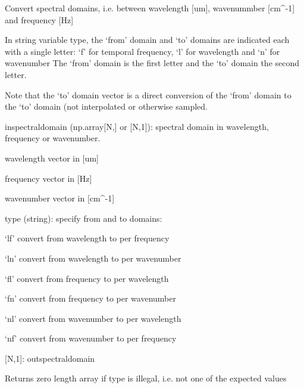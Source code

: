 \documentclass[a4paper,10pt,english]{sphinxmanual}
\begin{document}
\begin{fulllineitems}
\label{ryutils:pyradi.ryutils.convertSpectralDomain}
Convert spectral domains, i.e. between wavelength {[}um{]}, wavenummber {[}cm\textasciicircum{}-1{]} and frequency {[}Hz{]}

In string variable type, the `from' domain and `to' domains are indicated each with a single letter:
`f' for temporal frequency, `l' for wavelength and `n' for wavenumber
The `from' domain is the first letter and the `to' domain the second letter.

Note that the `to' domain vector is a direct conversion of the `from' domain
to the `to' domain (not interpolated or otherwise sampled.
\begin{description}
\item[{Args:}] \leavevmode
\begin{DUlineblock}{0em}
\item[] inspectraldomain (np.array{[}N,{]} or {[}N,1{]}):  spectral domain in wavelength, frequency or wavenumber.
\item[]
\begin{DUlineblock}{\DUlineblockindent}
\item[] wavelength vector in  {[}um{]}
\item[] frequency vector in  {[}Hz{]}
\item[] wavenumber vector in   {[}cm\textasciicircum{}-1{]}
\end{DUlineblock}
\item[] type (string):  specify from and to domains:
\item[]
\begin{DUlineblock}{\DUlineblockindent}
\item[] `lf' convert from wavelength to per frequency
\item[] `ln' convert from wavelength to per wavenumber
\item[] `fl' convert from frequency to per wavelength
\item[] `fn' convert from frequency to per wavenumber
\item[] `nl' convert from wavenumber to per wavelength
\item[] `nf' convert from wavenumber to per frequency
\end{DUlineblock}
\end{DUlineblock}

\item[{Returns:}] \leavevmode
\begin{DUlineblock}{0em}
\item[] {[}N,1{]}: outspectraldomain
\item[] Returns zero length array if type is illegal, i.e. not one of the expected values
\end{DUlineblock}


\end{description}
\end{fulllineitems}
\end{document}
